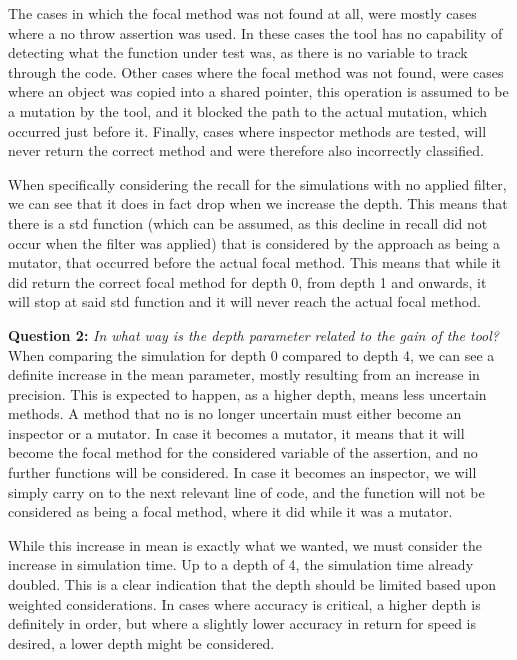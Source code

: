 \documentclass[11pt]{article}
\begin{document}
\begin{multicols}{2}
The cases in which the focal method was not found at all, were mostly cases where a no throw assertion was used. In these cases the tool has no capability of detecting what the function under test was, as there is no variable to track through the code. Other cases where the focal method was not found, were cases where an object was copied into a shared pointer, this operation is assumed to be a mutation by the tool, and it blocked the path to the actual mutation, which occurred just before it. Finally, cases where inspector methods are tested, will never return the correct method and were therefore also incorrectly classified.

When specifically considering the recall for the simulations with no applied filter, we can see that it does in fact drop when we increase the depth. This means that there is a std function (which can be assumed, as this decline in recall did not occur when the filter was applied) that is considered by the approach as being a mutator, that occurred before the actual focal method. This means that while it did return the correct focal method for depth 0, from depth 1 and onwards, it will stop at said std function and it will never reach the actual focal method.

\textbf{Question 2:} \textit{In what way is the depth parameter related to the gain of the tool?}\\
When comparing the simulation for depth 0 compared to depth 4, we can see a definite increase in the mean parameter, mostly resulting from an increase in precision. This is expected to happen, as a higher depth, means less uncertain methods. A method that no is no longer uncertain must either become an inspector or a mutator. In case it becomes a mutator, it means that it will become the focal method for the considered variable of the assertion, and no further functions will be considered. In case it becomes an inspector, we will simply carry on to the next relevant line of code, and the function will not be considered as being a focal method, where it did while it was a mutator.

While this increase in mean is exactly what we wanted, we must consider the increase in simulation time. Up to a depth of 4, the simulation time already doubled. This is a clear indication that the depth should be limited based upon weighted considerations. In cases where accuracy is critical, a higher depth is definitely in order, but where a slightly lower accuracy in return for speed is desired, a lower depth might be considered. 


\end{multicols}
\end{document}
